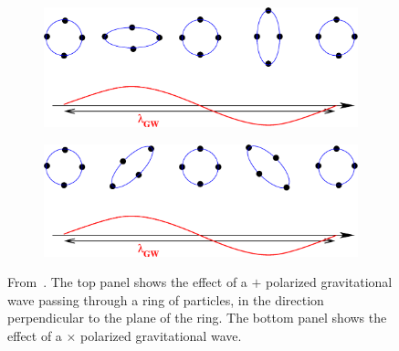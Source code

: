 \begin{figure}[!t]
\centering
\begin{subfigure}{.80\textwidth}
  \centering
  \includegraphics[width=.95\linewidth]{intro/GW1}
\end{subfigure}
\begin{subfigure}{.80\textwidth}
  \centering
  \includegraphics[width=.95\linewidth]{intro/GW2}
\end{subfigure}
\caption[Effect of gravitational waves on a ring of particles.]{From~\cite{Buonanno:2007yg}. The top panel shows the effect of a $+$ polarized gravitational wave passing through a ring of particles, in the direction perpendicular to the plane of the ring. The bottom panel shows the effect of a $\times$ polarized gravitational wave.}
\label{fig:GWRing}
\end{figure}

